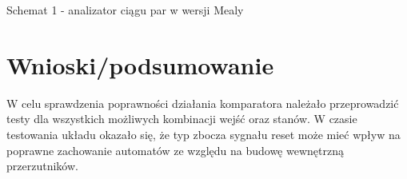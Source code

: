 \documentclass[12pt,a4paper]{article}
\begin{document}
		\vspace{1.5cm}
		\begin{center}
			Schemat 1 - analizator ciągu par w wersji Mealy
		\end{center}

	\section{Wnioski/podsumowanie}
	
			W celu sprawdzenia poprawności działania komparatora należało przeprowadzić testy dla wszystkich możliwych kombinacji wejść oraz stanów. W czasie testowania układu okazało się, że typ zbocza sygnału reset może mieć
			wpływ na poprawne zachowanie automatów ze względu na budowę wewnętrzną przerzutników. 
	
\end{document}
